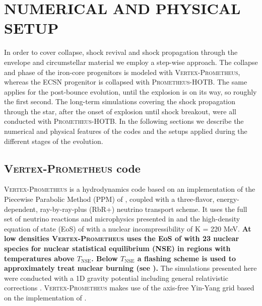 \documentclass[fleqn,usenatbib]{mnras}
\newcommand{\prom}{\textsc{Prometheus-HOTB}\xspace}
\newcommand{\vertexprom}{\textsc{Vertex-Prometheus}\xspace}
\begin{document}
\section{NUMERICAL AND PHYSICAL SETUP}
\label{sec:Numerical and physical Setup}
In order to cover collapse, shock revival and shock propagation through the envelope and circumstellar material we employ a step-wise approach.
The collapse and phase of the iron-core progenitors is modeled with \vertexprom, whereas the ECSN progenitor is collapsed with \prom.
The same applies for the post-bounce evolution, until the explosion is on its way, so roughly the first second. 
The long-term simulations covering the shock propagation through the star, after the onset of explosion until shock breakout, were all conducted with \prom.
In the following sections we describe the numerical and physical features of the codes and the setups applied during the different stages of the evolution.

\subsection{\vertexprom code}
\vertexprom is a hydrodynamics code based on an implementation of the Piecewise Parabolic Method (PPM) of \cite{Colella1984}, coupled with a three-flavor, energy-dependent, ray-by-ray-plus (RbR+) 
neutrino transport scheme. It uses the full set of neutrino reactions and microphysics presented in \cite{Buras2006} and the high-density equation of state (EoS) of \cite{Lattimer1991} with a nuclear incompressibility of K = 220 MeV.
\textbf{At low densities \vertexprom uses the EoS of \cite{Janka1999} with 23 nuclear species for nuclear statistical equilibrium (NSE) in regions with temperatures above $T_{\mathrm{NSE}}$. Below $T_{\mathrm{NSE}}$ a flashing scheme is used to approximately treat nuclear burning (see \citealt{Rampp2002}). }
The simulations presented here were conducted with a 1D gravity potential including general relativistic corrections \citep{Marek2006}. \vertexprom makes use of the axis-free Yin-Yang grid \citep{Kageyama2004} based on the implementation of \cite{Melson2016}.
\end{document}
